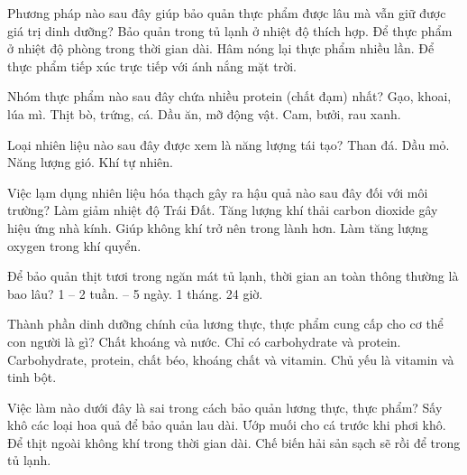 \begin{ex}
    Phương pháp nào sau đây giúp bảo quản thực phẩm được lâu mà vẫn giữ được giá trị dinh dưỡng?
    \choice
        {\True Bảo quản trong tủ lạnh ở nhiệt độ thích hợp.}
        {Để thực phẩm ở nhiệt độ phòng trong thời gian dài.}
        {Hâm nóng lại thực phẩm nhiều lần.}
        {Để thực phẩm tiếp xúc trực tiếp với ánh nắng mặt trời.}
\end{ex}

\begin{ex}
    Nhóm thực phẩm nào sau đây chứa nhiều protein (chất đạm) nhất?
    \choice
        {Gạo, khoai, lúa mì.}
        {\True Thịt bò, trứng, cá.}
        {Dầu ăn, mỡ động vật.}
        {Cam, bưởi, rau xanh.}
\end{ex}

\begin{ex}
    Loại nhiên liệu nào sau đây được xem là năng lượng tái tạo?
    \choice
        {Than đá.}
        {Dầu mỏ.}
        {\True Năng lượng gió.}
        {Khí tự nhiên.}
\end{ex}

\begin{ex}
    Việc lạm dụng nhiên liệu hóa thạch gây ra hậu quả nào sau đây đối với môi trường?
    \choice
        {Làm giảm nhiệt độ Trái Đất.}
        {\True Tăng lượng khí thải carbon dioxide gây hiệu ứng nhà kính.}
        {Giúp không khí trở nên trong lành hơn.}
        {Làm tăng lượng oxygen trong khí quyển.}
\end{ex}

\begin{ex}
    Để bảo quản thịt tươi trong ngăn mát tủ lạnh, thời gian an toàn thông thường là bao lâu?
    \choice
        {1 -- 2 tuần.}
        { -- 5 ngày.}
        {1 tháng.}
        {24 giờ.}
\end{ex}

\begin{ex}
    Thành phần dinh dưỡng chính của lương thực, thực phẩm cung cấp cho cơ thể con người là gì?
    \choice
        {Chất khoáng và nước.}
        {Chỉ có carbohydrate và protein.}
        {\True Carbohydrate, protein, chất béo, khoáng chất và vitamin.}
        {Chủ yếu là vitamin và tinh bột.}
\end{ex}

\begin{ex}
    Việc làm nào dưới đây là sai trong cách bảo quản lương thực, thực phẩm?
    \choice
        {Sấy khô các loại hoa quả để bảo quản lau dài.}
        {Ướp muối cho cá trước khi phơi khô.}
        {\True Để thịt ngoài không khí trong thời gian dài.}
        {Chế biến hải sản sạch sẽ rồi để trong tủ lạnh.}
\end{ex}

